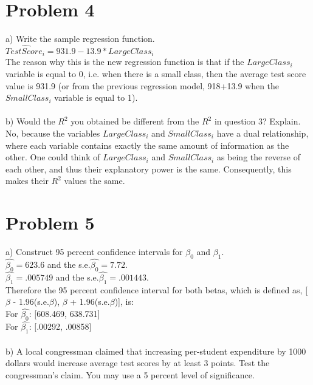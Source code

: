 \documentclass[11pt, oneside]{article}   	%
\begin{document}
\section{Problem 4}
a) Write the sample regression function.\\
$\widehat{TestScore_i} = 931.9 - 13.9 * LargeClass_i$\\
The reason why this is the new regression function is that if the $LargeClass_i$ variable is equal to 0, i.e. when there is a small class, then the average test score value is 931.9 (or from the previous regression model, 918+13.9 when the $SmallClass_i$ variable is equal to 1). \\~\\
b) Would the $R^2$ you obtained be different from the $R^2$ in question 3? Explain.\\
No, because the variables $LargeClass_i$ and $SmallClass_i$ have a dual relationship, where each variable contains exactly the same amount of information as the other. One could think of $LargeClass_i$ and $SmallClass_i$ as being the reverse of each other, and thus their explanatory power is the same. Consequently, this makes their $R^2$ values the same.

\section{Problem 5}
a) Construct 95 percent confidence intervals for $\beta_0$ and $\beta_1$.\\
$\hat{\beta_0} = 623.6$ and the s.e.$\hat{\beta_0} = 7.72$.\\
$\hat{\beta_1} = .005749$ and the s.e.$\hat{\beta_1} = .001443$.\\
Therefore the 95 percent confidence interval for both betas, which is defined as, [$\beta$ - 1.96(s.e.$\beta$), $\beta$ + 1.96(s.e.$\beta$)], is:\\
For $\hat{\beta_0}$: [608.469, 638.731]\\
For $\hat{\beta_1}$: [.00292, .00858]\\~\\
b) A local congressman claimed that increasing per-student expenditure by 1000 dollars would increase average test scores by at least 3 points. Test the congressman's claim. You may use a 5 percent level of significance.\\
\end{document}
